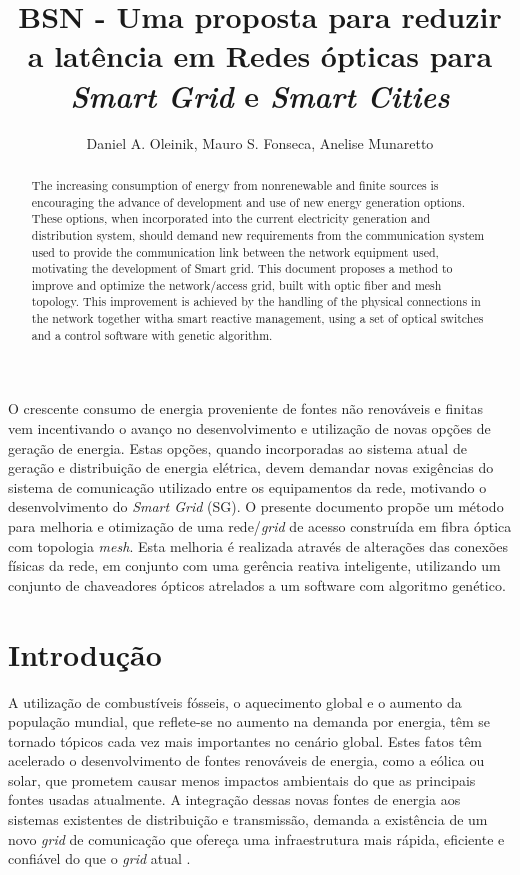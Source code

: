 \documentclass[12pt]{article}
\title{BSN - Uma proposta para reduzir a latência em Redes ópticas para \emph{Smart Grid} e \emph{Smart Cities}}
\author{Daniel A. Oleinik\inst{1}, Mauro S. Fonseca\inst{1}, Anelise Munaretto\inst{1}}
\begin{document}
 

\maketitle

\begin{abstract}
  The increasing consumption of energy from nonrenewable and finite sources is encouraging the advance of development and use
of new energy generation options. These options, when incorporated into the current electricity generation and distribution system,
should demand new requirements from the communication system used to provide the communication link between the network
equipment used, motivating the development of Smart grid. This document proposes a method to improve and optimize the network/access grid, built with optic fiber and mesh topology. This improvement is achieved by the handling of the physical connections in the network together witha smart reactive management, using a set of optical switches and a control software with genetic algorithm.
\end{abstract}
     
\begin{resumo} 
 O crescente consumo de energia proveniente de fontes não renováveis e finitas vem incentivando o avanço no desenvolvimento e utilização de novas opções de geração de energia. Estas opções, quando incorporadas ao sistema atual de geração e distribuição de energia elétrica, devem demandar novas exigências do sistema de comunicação utilizado entre os equipamentos da rede, motivando o desenvolvimento do \emph{Smart Grid} (SG). O presente documento propõe um método para melhoria e otimização de uma rede/\emph{grid} de acesso construída em fibra óptica com topologia \emph{mesh}. Esta melhoria é realizada através de alterações das conexões físicas da rede, em conjunto com uma gerência reativa inteligente, utilizando um conjunto de chaveadores ópticos atrelados a um software com algoritmo genético.
\end{resumo}


\section{Introdução}

A utilização de combustíveis fósseis, o aquecimento global e o aumento da população mundial, que reflete-se no aumento na demanda por energia, têm se tornado tópicos cada vez mais importantes no cenário global. Estes fatos têm acelerado o desenvolvimento de fontes renováveis de energia, como a eólica ou solar, que prometem causar menos impactos ambientais do que as principais fontes usadas atualmente. A integração dessas novas fontes de energia aos sistemas existentes de distribuição e transmissão, demanda a existência de um novo \emph{grid} de comunicação que ofereça uma infraestrutura mais rápida, eficiente e confiável do que o \emph{grid} atual \cite{Art_Gungor2013}.
\end{document}
